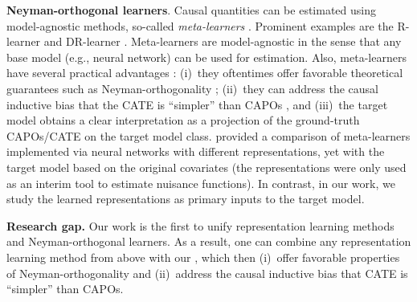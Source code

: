 \textbf{Neyman-orthogonal learners}. Causal quantities can be estimated using model-agnostic methods, so-called \emph{meta-learners} \citep{kunzel2019metalearners}. Prominent examples are the R-learner \citep{nie2021quasi} and DR-learner \citep{kennedy2023towards,curth2020estimating}. %
Meta-learners are model-agnostic in the sense that any base model (e.g., neural network) can be used for estimation. Also, meta-learners have several practical advantages \citep{morzywolek2023general}: (i)~they oftentimes offer favorable theoretical guarantees such as Neyman-orthogonality \citep{chernozhukov2017double,foster2023orthogonal}; (ii)~they can address the causal inductive bias that the CATE is ``simpler'' than CAPOs \citep{curth2021inductive}, and (iii)~the target model obtains a clear interpretation as a projection of the ground-truth CAPOs/CATE on the target model class. {\citet{curth2021nonparametric,frauen2025modelagnostic} provided a comparison of meta-learners implemented via neural networks with different representations, yet with the target model based on the original covariates (the representations were only used as an interim tool to estimate nuisance functions). In contrast, in our work, we study the learned representations as primary inputs to the target model.}

\textbf{Research gap.} Our work is the first to unify representation learning methods and Neyman-orthogonal learners. As a result, one can combine any representation learning method from above with our \ORlearners, which then (i)~offer favorable properties of Neyman-orthogonality and (ii)~address the causal inductive bias that CATE is ``simpler'' than CAPOs. 

